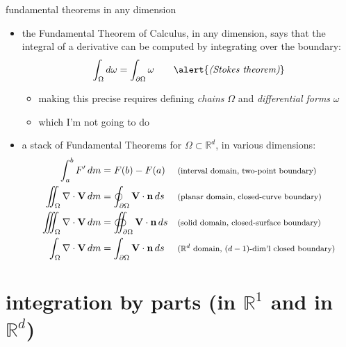 \documentclass[10pt,
               svgnames,
               hyperref={colorlinks,
                         citecolor=DeepPink4,
                         linkcolor=FireBrick,
                         urlcolor=blue},
               usepdftitle=false]{beamer}
\newcommand{\bn}{\mathbf{n}}
\newcommand{\bV}{\mathbf{V}}
\newcommand{\RR}{\mathbb{R}}
\newcommand{\Div}{\nabla\cdot}
\begin{document}
\begin{frame}{fundamental theorems in any dimension}

\begin{itemize}
\item the Fundamental Theorem of Calculus, in any dimension, says that the integral of a derivative can be computed by integrating over the boundary:
    $$\int_\Omega d\omega = \int_{\partial\Omega} \omega \qquad \text{\alert{\emph{(Stokes theorem)}}}$$

    \begin{itemize}
    \item[$\circ$] making this precise requires defining \emph{chains} $\Omega$ and \emph{differential forms} $\omega$
    \item[$\circ$] which I'm not going to do
    \end{itemize}
\item a stack of Fundamental Theorems for $\Omega\subset\RR^d$, in various dimensions:
\begin{align*}
\int_a^b F'\,dm &= F(b)-F(a) &&\text{\footnotesize (interval domain, two-point boundary)} \\
\iint_\Omega \Div \bV\,dm &= \oint_{\partial\Omega} \bV\cdot \bn\,ds &&\text{\footnotesize (planar domain, closed-curve boundary)} \\
\iiint_\Omega \Div \bV\,dm &= \oiint_{\partial\Omega} \bV\cdot \bn\,ds &&\text{\footnotesize (solid domain, closed-surface boundary)} \\
\int_\Omega \Div \bV\,dm &= \int_{\partial\Omega} \bV\cdot \bn\,ds &&\text{\footnotesize ($\RR^d$ domain, $(d-1)$-dim'l closed boundary)}
\end{align*}
\end{itemize}
\end{frame}


\section{integration by parts (in $\RR^1$ and in $\RR^d$)}
\end{document}
